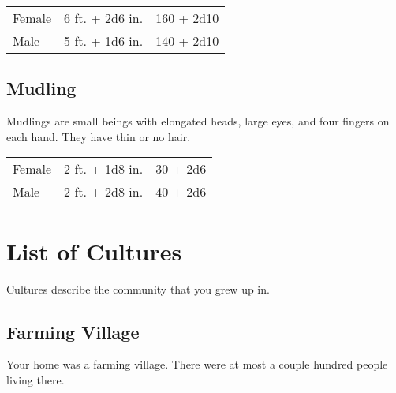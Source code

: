 \begin{multicols}{2}
\begin{center}
{
\begin{xtabular}{|l|l|l|}
Female & 6 ft. + 2d6 in. & 160 + 2d10 \\
Male & 5 ft. + 1d6 in. & 140 + 2d10 \\
\hline
\end{xtabular}
}
\end{center}

\subsection{Mudling}

Mudlings are small beings with elongated heads, large eyes, and four fingers on each hand. They
have thin or no hair.

\begin{center}
{
\begin{xtabular}{|l|l|l|}
Female & 2 ft. + 1d8 in. & 30 + 2d6 \\
Male & 2 ft. + 2d8 in. & 40 + 2d6 \\
\hline
\end{xtabular}
}
\end{center}

\section{List of Cultures}

Cultures describe the community that you grew up in. 

\subsection{Farming Village}

Your home was a farming village. There were at most a couple hundred
people living there.


\end{multicols}
